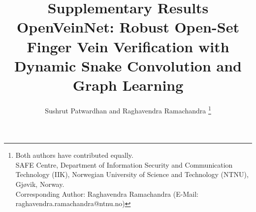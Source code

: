 \documentclass[10pt,journal,compsoc]{IEEEtran}
\begin{document}
%
\title{Supplementary Results \\ OpenVeinNet: Robust Open-Set Finger Vein Verification with Dynamic Snake Convolution and Graph Learning}
%
%
%
%

\author{Sushrut Patwardhan and
        Raghavendra Ramachandra%
\thanks{Both authors have contributed equally. \\
SAFE Centre, Department of Information Security and Communication Technology (IIK), Norwegian University of Science and Technology (NTNU), Gjøvik, Norway.  \\
            Corresponding Author: Raghavendra Ramachandra (E-Mail: raghavendra.ramachandra@ntnu.no)}}
\end{document}
